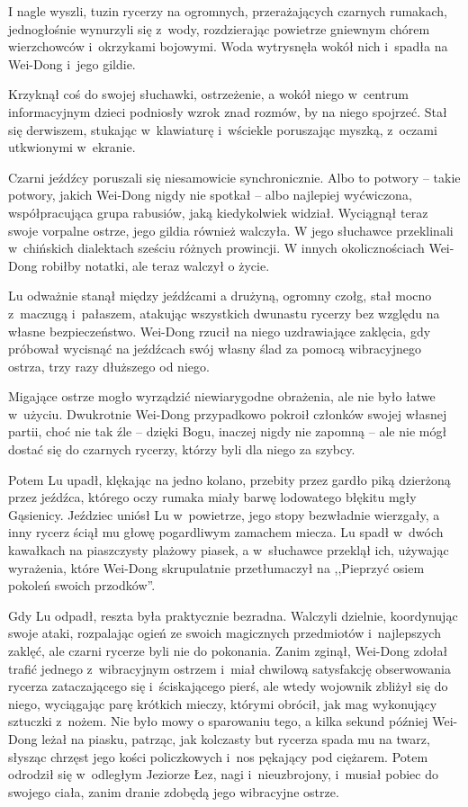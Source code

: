 \documentclass[oneside,polish,11pt,rmheadings]{mwbk}
\begin{document}
I nagle wyszli, tuzin rycerzy na ogromnych, przerażających czarnych rumakach, jednogłośnie wynurzyli się z~wody, rozdzierając powietrze gniewnym chórem wierzchowców i~okrzykami bojowymi. Woda wytrysnęła wokół nich i~spadła na Wei-Dong i~jego gildie. 


Krzyknął coś do swojej słuchawki, ostrzeżenie, a wokół niego w~centrum informacyjnym dzieci podniosły wzrok znad rozmów, by na niego spojrzeć. Stał się derwiszem, stukając w~klawiaturę i~wściekle poruszając myszką, z~oczami utkwionymi w~ekranie. 


Czarni jeźdźcy poruszali się niesamowicie synchronicznie. Albo to potwory -- takie potwory, jakich Wei-Dong nigdy nie spotkał -- albo najlepiej wyćwiczona, współpracująca grupa rabusiów, jaką kiedykolwiek widział. Wyciągnął teraz swoje vorpalne ostrze, jego gildia również walczyła. W jego słuchawce przeklinali w~chińskich dialektach sześciu różnych prowincji. W innych okolicznościach Wei-Dong robiłby notatki, ale teraz walczył o życie. 


Lu odważnie stanął między jeźdźcami a drużyną, ogromny czołg, stał mocno z~maczugą i~pałaszem, atakując wszystkich dwunastu rycerzy bez względu na własne bezpieczeństwo. Wei-Dong rzucił na niego uzdrawiające zaklęcia, gdy próbował wycisnąć na jeźdźcach swój własny ślad za pomocą wibracyjnego ostrza, trzy razy dłuższego od niego. 


Migające ostrze mogło wyrządzić niewiarygodne obrażenia, ale nie było łatwe w~użyciu. Dwukrotnie Wei-Dong przypadkowo pokroił członków swojej własnej partii, choć nie tak źle -- dzięki Bogu, inaczej nigdy nie zapomną -- ale nie mógł dostać się do czarnych rycerzy, którzy byli dla niego za szybcy. 


Potem Lu upadł, klękając na jedno kolano, przebity przez gardło piką dzierżoną przez jeźdźca, którego oczy rumaka miały barwę lodowatego błękitu mgły Gąsienicy. Jeździec uniósł Lu w~powietrze, jego stopy bezwładnie wierzgały, a inny rycerz ściął mu głowę pogardliwym zamachem miecza. Lu spadł w~dwóch kawałkach na piaszczysty plażowy piasek, a w~słuchawce przeklął ich, używając wyrażenia, które Wei-Dong skrupulatnie przetłumaczył na ,,Pieprzyć osiem pokoleń swoich przodków''. 


Gdy Lu odpadł, reszta była praktycznie bezradna. Walczyli dzielnie, koordynując swoje ataki, rozpalając ogień ze swoich magicznych przedmiotów i~najlepszych zaklęć, ale czarni rycerze byli nie do pokonania. Zanim zginął, Wei-Dong zdołał trafić jednego z~wibracyjnym ostrzem i~miał chwilową satysfakcję obserwowania rycerza zataczającego się i~ściskającego pierś, ale wtedy wojownik zbliżył się do niego, wyciągając parę krótkich mieczy, którymi obrócił, jak mag wykonujący sztuczki z~nożem. Nie było mowy o sparowaniu tego, a kilka sekund później Wei-Dong leżał na piasku, patrząc, jak kolczasty but rycerza spada mu na twarz, słysząc chrzęst jego kości policzkowych i~nos pękający pod ciężarem. Potem odrodził się w~odległym Jeziorze Łez, nagi i~nieuzbrojony, i~musiał pobiec do swojego ciała, zanim dranie zdobędą jego wibracyjne ostrze. 
\end{document}
